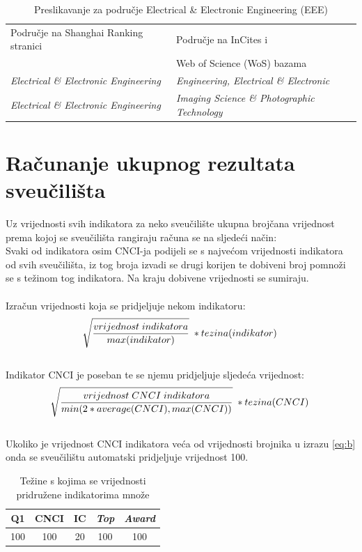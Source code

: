 \documentclass[times, utf8, zavrsni]{fer}
\begin{document}
\begin{table}[htb]
    \caption{Preslikavanje za područje Electrical \& Electronic Engineering (EEE)}
        \label{tbl:konstante1}
        \centering
        \begin{tabular}{ll} \hline
        Područje na Shanghai Ranking stranici & Područje na InCites i \\ & Web of Science (WoS) bazama\\ \hline
        \emph{Electrical \& Electronic Engineering} &  \emph{Engineering, Electrical \& Electronic}\\
        \emph{Electrical \& Electronic Engineering} &  \emph{Imaging Science \& Photographic Technology}\\
        \end{tabular}
        \end{table}    
        \FloatBarrier
\newpage
\section{Računanje ukupnog rezultata sveučilišta}
Uz vrijednosti svih indikatora za neko sveučilište ukupna brojčana vrijednost prema kojoj se sveučilišta rangiraju računa 
se na sljedeći način:
\\Svaki od indikatora osim CNCI-ja podijeli se s najvećom vrijednosti indikatora od svih sveučilišta, iz tog broja izvadi se
drugi korijen te dobiveni broj pomnoži se s težinom tog indikatora.
Na kraju dobivene vrijednosti se sumiraju.
\\
\\ Izračun vrijednosti koja se pridjeljuje nekom indikatoru: 
\begin{align}
    \sqrt[\leftroot{-2}]{\frac{vrijednost \; indikatora}{max(indikator)}} \; * tezina(indikator) \label{eq:a}
\end{align}
\\ Indikator CNCI je poseban te se njemu pridjeljuje sljedeća vrijednost: \\ 
\begin{align}
    \sqrt[\leftroot{-2}]{\frac{vrijednost \; CNCI \; indikatora}{min(2*average(CNCI), max(CNCI))}} \; * tezina(CNCI) \label{eq:b}
    \end{align}
\\ Ukoliko je vrijednost CNCI indikatora veća od vrijednosti brojnika u izrazu \ref{eq:b} onda se sveučilištu automatski pridjeljuje vrijednost 100.

\begin{table}[htb]
    \caption{Težine s kojima se vrijednosti pridružene indikatorima množe}
        \label{tbl:konstante3}
        \centering
        \begin{tabular}{ccccc} \hline
        Q1 & CNCI & IC & \emph{Top} & \emph{Award} \\ \hline
        100&100&20&100&100\\
        \end{tabular}
        \end{table}    
        \FloatBarrier
\end{document}
